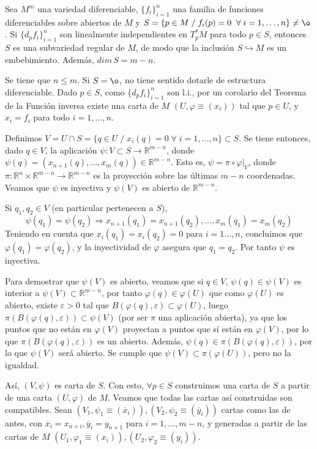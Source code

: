 \begin{teo}
Sea $M^m$ una variedad diferenciable, $\{f_i\}_{i=1}^n$ una familia de funciones diferenciables sobre abiertos de $M$ y $S = \{p \in M \;/\; f_i(p) = 0\;\;\forall\; i = 1,\dots,n\} \neq \o$. Si $\{d_p f_i\}_{i=1}^n$ son linealmente independientes en $T_p^* M$ para todo $p \in S$, entonces $S$ es una subvariedad regular de $M$, de modo que la inclusión $S \hookrightarrow M$ es un embebimiento. Adem\'as, $dim \, S = m-n$.
\end{teo}
\begin{dem}
Se tiene que $n \leq m$. Si $S = \o$, no tiene sentido dotarle de estructura diferenciable. Dado $p \in S$, como $\{d_pf_i\}_{i=1}^n$ son l.i., por un corolario del Teorema de la Función inversa existe una carta de $M$ $(U,\varphi\equiv (x_i))$ tal que $p \in U$, y $x_i = f_i$ para todo $i = 1,\dots,n$.

Definimos $V = U \cap S = \{q \in U \; / \; x_i(q) = 0 \;\forall\;i=1,\dots,n\} \subset S$. Se tiene entonces, dado $q \in V$, la aplicación $\psi:V\subset S \to \mathbb{R}^{m-n}$, donde $\psi(q) = (x_{n+1}(q),\dots,x_m(q)) \in \mathbb{R}^{m-n}$. Esto es, $\psi = \pi \circ \varphi|_V$, donde $\pi:\mathbb{R}^n \times \mathbb{R}^{m-n} \to \mathbb{R}^{m-n}$ es la proyección sobre las últimas $m-n$ coordenadas. Veamos que $\psi$ es inyectiva y $\psi(V)$ es abierto de $\mathbb{R}^{m-n}$.

Si $q_1,q_2 \in V$ (en particular pertenecen a $S$), $$\psi(q_1) = \psi(q_2) \Rightarrow x_{n+1}(q_1) = x_{n+1}(q_2),\dots , x_m(q_1) = x_m(q_2)$$Teniendo en cuenta que $x_i(q_1)=x_i(q_2) = 0$ para $i=1\dots, n$, concluimos que $\varphi(q_1) = \varphi(q_2)$, y la inyectividad de $\varphi$ asegura que $q_1 = q_2$. Por tanto $\psi$ es inyectiva. 

Para demostrar que $\psi(V)$ es abierto, veamos que si $q\in V$, $\psi(q) \in \psi(V)$ es interior a $\psi(V) \subset \mathbb{R}^{m-n}$, por tanto $\varphi(q) \in \varphi(U)$ que como $\varphi(U)$ es abierto, existe $\varepsilon > 0 $ tal que $B(\varphi(q),\varepsilon)\subset \varphi(U)$, luego $\pi(B(\varphi(q),\varepsilon)) \subset \psi(V)$ (por ser $\pi$ una aplicaci\'on abierta), ya que los puntos que no están en $\varphi(V)$ proyectan a puntos que sí están en $\varphi(V)$, por lo que $\pi(B(\varphi(q),\varepsilon))$ es un abierto. Además, $\psi(q) \in \pi(B(\varphi(q),\varepsilon))$, por lo que $\psi(V)$ será abierto. Se cumple que $\psi(V) \subset \pi(\varphi(U))$, pero no la igualdad.

As\'i, $(V, \psi)$ es carta de $S$. Con esto, $\forall p \in S$ construimos una carta de $S$ a partir de una carta $(U, \varphi)$ de $M$. Veamos que todas las cartas así construidas son compatibles. Sean $(V_1,\psi_1\equiv (\overline{x}_i)), (V_2,\psi_2\equiv (\overline{y}_i))$ cartas como las de antes, con $\overline{x}_i = x_{n+i}, \overline{y}_i = y_{n+1}$ para $i = 1,\dots, m-n$, y generadas a partir de las cartas de $M$ $(U_1,\varphi_1\equiv (x_i)), (U_2,\varphi_2\equiv (y_i))$.


\end{dem}
